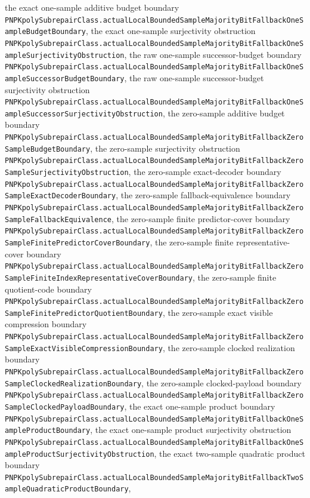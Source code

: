 \documentclass[11pt]{article}
\theoremstyle{remark}
\begin{document}
the exact one-sample additive budget boundary
\texttt{PNPKpolySubrepairClass.actualLocalBoundedSampleMajorityBitFallbackOneSampleBudgetBoundary},
the exact one-sample surjectivity obstruction
\texttt{PNPKpolySubrepairClass.actualLocalBoundedSampleMajorityBitFallbackOneSampleSurjectivityObstruction},
the raw one-sample successor-budget boundary
\texttt{PNPKpolySubrepairClass.actualLocalBoundedSampleMajorityBitFallbackOneSampleSuccessorBudgetBoundary},
the raw one-sample successor-budget surjectivity obstruction
\texttt{PNPKpolySubrepairClass.actualLocalBoundedSampleMajorityBitFallbackOneSampleSuccessorSurjectivityObstruction},
the zero-sample additive budget boundary
\texttt{PNPKpolySubrepairClass.actualLocalBoundedSampleMajorityBitFallbackZeroSampleBudgetBoundary},
the zero-sample surjectivity obstruction
\texttt{PNPKpolySubrepairClass.actualLocalBoundedSampleMajorityBitFallbackZeroSampleSurjectivityObstruction},
the zero-sample exact-decoder boundary
\texttt{PNPKpolySubrepairClass.actualLocalBoundedSampleMajorityBitFallbackZeroSampleExactDecoderBoundary},
the zero-sample fallback-equivalence boundary
\texttt{PNPKpolySubrepairClass.actualLocalBoundedSampleMajorityBitFallbackZeroSampleFallbackEquivalence},
the zero-sample finite predictor-cover boundary
\texttt{PNPKpolySubrepairClass.actualLocalBoundedSampleMajorityBitFallbackZeroSampleFinitePredictorCoverBoundary},
the zero-sample finite representative-cover boundary
\texttt{PNPKpolySubrepairClass.actualLocalBoundedSampleMajorityBitFallbackZeroSampleFiniteIndexRepresentativeCoverBoundary},
the zero-sample finite quotient-code boundary
\texttt{PNPKpolySubrepairClass.actualLocalBoundedSampleMajorityBitFallbackZeroSampleFinitePredictorQuotientBoundary},
the zero-sample exact visible compression boundary
\texttt{PNPKpolySubrepairClass.actualLocalBoundedSampleMajorityBitFallbackZeroSampleExactVisibleCompressionBoundary},
the zero-sample clocked realization boundary
\texttt{PNPKpolySubrepairClass.actualLocalBoundedSampleMajorityBitFallbackZeroSampleClockedRealizationBoundary},
the zero-sample clocked-payload boundary
\texttt{PNPKpolySubrepairClass.actualLocalBoundedSampleMajorityBitFallbackZeroSampleClockedPayloadBoundary},
the exact one-sample product boundary
\texttt{PNPKpolySubrepairClass.actualLocalBoundedSampleMajorityBitFallbackOneSampleProductBoundary},
the exact one-sample product surjectivity obstruction
\texttt{PNPKpolySubrepairClass.actualLocalBoundedSampleMajorityBitFallbackOneSampleProductSurjectivityObstruction},
the exact two-sample quadratic product boundary
\texttt{PNPKpolySubrepairClass.actualLocalBoundedSampleMajorityBitFallbackTwoSampleQuadraticProductBoundary},
\end{document}
